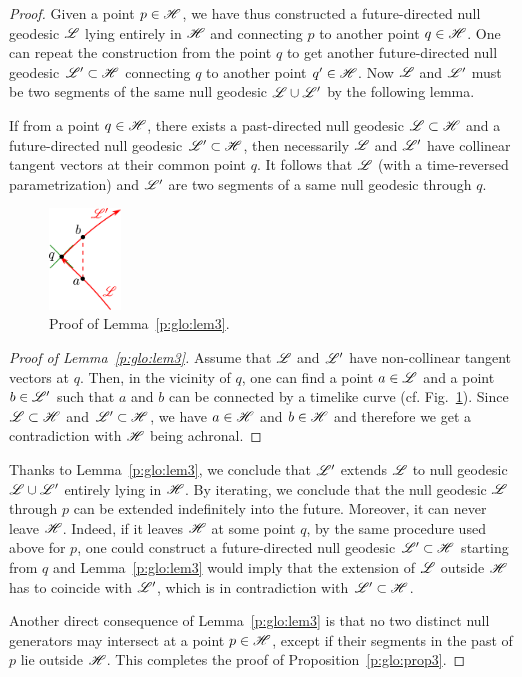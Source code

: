 \begin{proof}
Given a point $p\in\mathscr{H}$, we have thus constructed a
future-directed null geodesic $\mathscr{L}$ lying entirely in $\mathscr{H}$ and
connecting $p$ to another point $q\in\mathscr{H}$. One can
repeat the construction
from the point $q$ to get another future-directed null geodesic $\mathscr{L}'\subset\mathscr{H}$
connecting $q$ to another point $q'\in\mathscr{H}$. Now $\mathscr{L}$ and $\mathscr{L}'$ must
be two segments of the same null geodesic $\mathscr{L}\cup\mathscr{L}'$ by the following lemma.
\begin{lemma}
\label{p:glo:lem3}
If from a point $q\in\mathscr{H}$, there exists a past-directed
null geodesic $\mathscr{L}\subset\mathscr{H}$ and a future-directed null geodesic $\mathscr{L}'\subset\mathscr{H}$,
then necessarily $\mathscr{L}$ and $\mathscr{L}'$ have collinear tangent vectors at their common point $q$.
It follows that $\mathscr{L}$ (with a time-reversed parametrization) and $\mathscr{L}'$ are two segments
of a same null geodesic through $q$.
\end{lemma}
\begin{figure}
\centerline{\includegraphics[width=0.17\textwidth]{glo_unique_geod.pdf}}
\caption[]{\label{f:glo:unique_geod} \footnotesize
Proof of Lemma~\ref{p:glo:lem3}.}
\end{figure}
\begin{proof}[Proof of Lemma~\ref{p:glo:lem3}]
Assume that $\mathscr{L}$ and $\mathscr{L}'$ have non-collinear tangent vectors at $q$. Then, in
the vicinity of $q$, one can find a point $a\in\mathscr{L}$ and a point $b\in\mathscr{L}'$
such that $a$ and $b$ can be connected by a timelike curve (cf.
Fig.~\ref{f:glo:unique_geod}). Since $\mathscr{L}\subset\mathscr{H}$ and $\mathscr{L}'\subset\mathscr{H}$, we have $a\in\mathscr{H}$ and
$b\in\mathscr{H}$ and therefore we get a contradiction with $\mathscr{H}$ being achronal.
\end{proof}
Thanks to Lemma~\ref{p:glo:lem3}, we conclude that $\mathscr{L}'$ extends $\mathscr{L}$ to null geodesic
$\mathscr{L}\cup\mathscr{L}'$ entirely lying in $\mathscr{H}$. By iterating, we conclude that
the null geodesic $\mathscr{L}$ through $p$ can be extended indefinitely into the
future. Moreover, it can never leave $\mathscr{H}$. Indeed, if it leaves $\mathscr{H}$ at
some point $q$, by the same procedure used above for $p$, one could construct a future-directed null geodesic
$\mathscr{L}'\subset\mathscr{H}$ starting from $q$ and Lemma~\ref{p:glo:lem3} would imply that
the extension of $\mathscr{L}$ outside $\mathscr{H}$ has to coincide with $\mathscr{L}'$, which is
in contradiction with $\mathscr{L}'\subset\mathscr{H}$.

Another direct consequence of Lemma~\ref{p:glo:lem3} is that no two distinct null generators
may intersect at a point $p\in\mathscr{H}$, except if their segments in the past of
$p$ lie outside $\mathscr{H}$.
This completes the proof of Proposition~\ref{p:glo:prop3}.
\end{proof}


